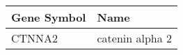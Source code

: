 \begin{tabular}{ll}
\toprule
Gene Symbol &            Name \\
\midrule
     CTNNA2 & catenin alpha 2 \\
\bottomrule
\end{tabular}
